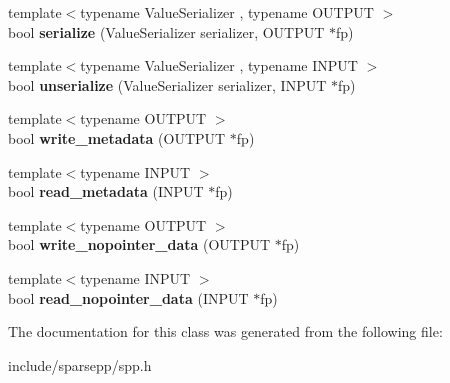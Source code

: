 \begin{DoxyCompactItemize}
\item 
{\footnotesize template$<$typename Value\+Serializer , typename O\+U\+T\+P\+UT $>$ }\\bool {\bfseries serialize} (Value\+Serializer serializer, O\+U\+T\+P\+UT $\ast$fp)\hypertarget{classspp___1_1sparse__hash__map_aaea6e172ebd2624faa6f5b5ca624ae1a}{}\label{classspp___1_1sparse__hash__map_aaea6e172ebd2624faa6f5b5ca624ae1a}

\item 
{\footnotesize template$<$typename Value\+Serializer , typename I\+N\+P\+UT $>$ }\\bool {\bfseries unserialize} (Value\+Serializer serializer, I\+N\+P\+UT $\ast$fp)\hypertarget{classspp___1_1sparse__hash__map_a4b9a6c0ed519db55e4835b253969d67f}{}\label{classspp___1_1sparse__hash__map_a4b9a6c0ed519db55e4835b253969d67f}

\item 
{\footnotesize template$<$typename O\+U\+T\+P\+UT $>$ }\\bool {\bfseries write\+\_\+metadata} (O\+U\+T\+P\+UT $\ast$fp)\hypertarget{classspp___1_1sparse__hash__map_ae757815b4a742f36b8c7c32161b79fa9}{}\label{classspp___1_1sparse__hash__map_ae757815b4a742f36b8c7c32161b79fa9}

\item 
{\footnotesize template$<$typename I\+N\+P\+UT $>$ }\\bool {\bfseries read\+\_\+metadata} (I\+N\+P\+UT $\ast$fp)\hypertarget{classspp___1_1sparse__hash__map_a4d27d561a9f6415579fda4bc5d04ff8b}{}\label{classspp___1_1sparse__hash__map_a4d27d561a9f6415579fda4bc5d04ff8b}

\item 
{\footnotesize template$<$typename O\+U\+T\+P\+UT $>$ }\\bool {\bfseries write\+\_\+nopointer\+\_\+data} (O\+U\+T\+P\+UT $\ast$fp)\hypertarget{classspp___1_1sparse__hash__map_ad0c6c1de189abd9e169a9175f4a794a5}{}\label{classspp___1_1sparse__hash__map_ad0c6c1de189abd9e169a9175f4a794a5}

\item 
{\footnotesize template$<$typename I\+N\+P\+UT $>$ }\\bool {\bfseries read\+\_\+nopointer\+\_\+data} (I\+N\+P\+UT $\ast$fp)\hypertarget{classspp___1_1sparse__hash__map_a1a5322634d7b40ef621ba209b025d1c0}{}\label{classspp___1_1sparse__hash__map_a1a5322634d7b40ef621ba209b025d1c0}

\end{DoxyCompactItemize}


The documentation for this class was generated from the following file\+:\begin{DoxyCompactItemize}
\item 
include/sparsepp/spp.\+h\end{DoxyCompactItemize}
